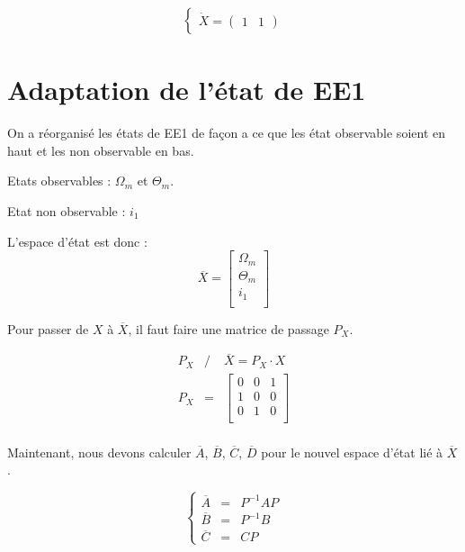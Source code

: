 \begin{align*}
\left\lbrace
\begin{aligned}
\dot{X} = \begin{pmatrix}
1&1
\end{pmatrix}
\end{aligned}
\right.
\end{align*}


\section{Adaptation de l'état de EE1}
On a réorganisé les états de EE1 de façon a ce que les état observable soient en haut et les non observable en bas.

\noindent\textbullet\hspace{2mm} Etats observables : $\Omega_m$ et $ \Theta_m$.

\noindent\textbullet\hspace{2mm} Etat non observable : $i_1$

\noindent\textbullet\hspace{2mm} L'espace d'état est donc : 
\begin{equation}
\overline{X} = \begin{bmatrix}
\Omega_m\\
\Theta_m\\
i_1\\
\end{bmatrix}
\end{equation}


Pour passer de $X$ à $\overline{X}$, il faut faire une matrice de passage $P_X$.

 \begin{eqnarray}
 P_X &/&  \overline{X} =P_X \cdot X \\
 P_X &=&\begin{bmatrix}
 0 & 0 & 1 \\
 1 & 0 & 0 \\
 0 & 1 & 0 \\
\end{bmatrix}  \\
 \end{eqnarray}

Maintenant, nous devons calculer $\overline{A}$, $\overline{B}$, $\overline{C}$, $\overline{D}$ pour le nouvel espace d'état lié à $\overline{X}$.

\begin{equation}%
	\left\lbrace%
	\begin{matrix}
		\overline{A} &=& P^{-1} A P \\%
		\overline{B} &=& P^{-1} B \\%
		\overline{C} &=& C P%
	\end{matrix}
\right.%
\end{equation}
